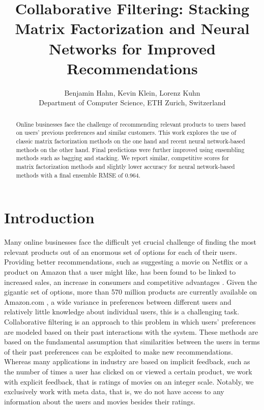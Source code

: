 \documentclass[10pt,conference,compsocconf]{IEEEtran}
\begin{document}
\title{Collaborative Filtering: Stacking Matrix Factorization and Neural Networks for Improved Recommendations}

\author{
  Benjamin Hahn, Kevin Klein, Lorenz Kuhn\\
  Department of Computer Science, ETH Zurich, Switzerland
}

\maketitle

\begin{abstract}
Online businesses face the challenge of recommending relevant products to users based on users' previous preferences and similar customers. This work explores the use of classic matrix factorization methods on the one hand and recent neural network-based methods on the other hand. Final predictions were further improved using ensembling methods such as bagging and stacking.
We report similar, competitive scores for matrix factorization methods and slightly lower accuracy for neural network-based methods with a final ensemble RMSE of 0.964.
\end{abstract}

\section{Introduction}

Many online businesses face the difficult yet crucial challenge of finding the most relevant products out of an enormous set of options for each of their users. Providing better recommendations, such as suggesting a movie on Netflix or a product on Amazon that a user might like, has been found to be linked to increased sales, an increase in consumers and competitive advantages \cite{hinz2010impact}.
Given the gigantic set of options, more than 570 million products are currently available on Amazon.com \cite{scrap2018}, a wide variance in preferences between different users and relatively little knowledge about individual users, this is a challenging task. Collaborative filtering \cite{sarwar2001item} is an approach to this problem in which users' preferences are modeled based on their past interactions with the system. These methods are based on the fundamental assumption that similarities between the users in terms of their past preferences can be exploited to make new recommendations. Whereas many applications in industry are based on implicit feedback, such as the number of times a user has clicked on or viewed a certain product, we work with explicit feedback, that is ratings of movies on an integer scale. Notably, we exclusively work with meta data, that is, we do not have access to any information about the users and movies besides their ratings.
\end{document}
